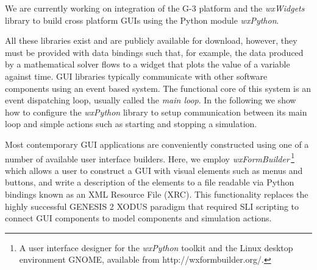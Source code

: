 \documentclass[12pt]{article}
\begin{document}
We are currently working on integration of the G-3 platform and the {\it wxWidgets}
library to build cross platform GUIs using the Python module {\it
  wxPython}. 

%
%

All these libraries exist and are publicly available for download,
however, they must be provided with data bindings such that, for
example, the data produced by a mathematical solver flows to a widget
that plots the value of a variable against time.
GUI libraries typically communicate with other software components
using an event based system.  The functional core of this system is an
event dispatching loop, usually called the {\it main loop}.  In the
following we show how to configure the {\it wxPython} library to setup
communication between its main loop and simple actions such as
starting and stopping a simulation.

Most contemporary GUI applications are conveniently constructed using
one of a number of available user interface builders.  Here, we employ {\it wxFormBuilder}\,\footnote{A user interface designer for the {\it wxPython}
toolkit and the Linux desktop environment GNOME, available from
http://wxformbuilder.org/.} which allows a user to construct a GUI with visual elements such as
menus and buttons, and write a description of the elements to a file
readable via Python
bindings known as an XML Resource File (XRC).  This functionality replaces the highly successful GENESIS 2
XODUS paradigm that required SLI scripting to connect GUI components
to model components and simulation actions.


\end{document}
